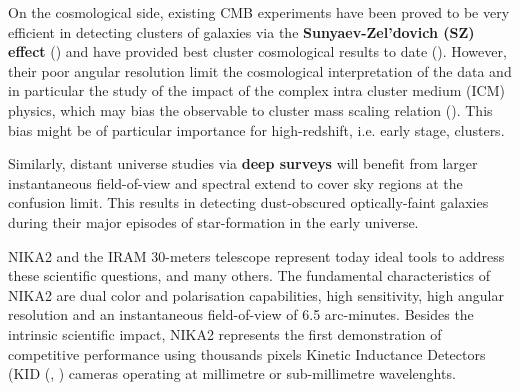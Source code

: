 \documentclass[]{aa} %
\begin{document}
On the cosmological side, existing CMB experiments have been proved to be very efficient in detecting clusters of galaxies via the \textbf{Sunyaev-Zel\textquoteright dovich (SZ) effect} (\cite{plancksz2,actsz,sptsz}) and have provided best cluster cosmological results to date (\cite{plancksp2,plancknc2}). However, their poor angular resolution limit the cosmological interpretation of the data and in particular the study of the impact of the complex intra cluster medium (ICM) physics, which may bias the observable to cluster mass scaling relation (\cite{plancknc2}). This bias might be of particular importance for high-redshift, i.e. early stage, clusters. 

Similarly, distant universe studies via \textbf{deep surveys} will benefit from larger instantaneous field-of-view and spectral extend to cover sky regions at the confusion limit. This results in detecting dust-obscured optically-faint galaxies during their major episodes of star-formation in the early universe. 

NIKA2 and the IRAM 30-meters telescope represent today ideal tools to address these scientific questions, and many others. The fundamental characteristics of NIKA2 are dual color and polarisation capabilities, high sensitivity, high angular resolution and an instantaneous field-of-view of 6.5 arc-minutes. Besides the intrinsic scientific impact, NIKA2 represents the first demonstration of competitive performance using thousands pixels Kinetic Inductance Detectors (KID (\cite{Day2003}, \cite{Doyle2010}) cameras operating at millimetre or sub-millimetre wavelenghts.

\end{document}
